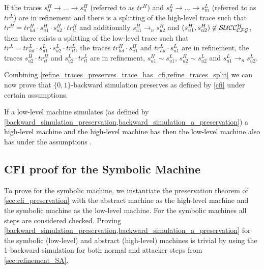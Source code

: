 \begin{lemma}
\label{refine_traces_split}
\renewcommand{\baselinestretch}{1.25}\normalsize If the traces $s^H_0
\to \ldots \to s^H_n$ (referred to as $tr^H$) and $s^L_0 \to \ldots
\to s^L_m$ (referred to as $tr^L$) are in refinement and there is a
splitting of the high-level trace such that $tr^H = tr^H_{hd} \cdot
s^H_{u1} \cdot s^H_{u2} \cdot tr^H_{tl}$ and additionally $s^H_{u1}
\to_n s^H_{u2}$ and $(s^H_{u1},s^H_{u2}) \not \in \mathcal{SUCC_\mathcal{CFG}^{H}}$, then
there exists a splitting of the low-level trace such that $tr^L =
tr^L_{hd}  \cdot  s^L_{u1}  \cdot  s^L_{u2}  \cdot  tr^L_{tl}$, the
traces $tr^H_{hd}  \cdot  s^H_{u1}$ and $tr^L_{hd}  \cdot  s^L_{u1}$
are in refinement, the traces $s^H_{u2}  \cdot  tr^H_{tl}$ and
$s^L_{u2}  \cdot  tr^L_{tl}$ are in refinement, $s^H_{u1} \sim
s^L_{u1}$, $s^H_{u2} \sim s^L_{u2}$ and $s^L_{u1} \to_n s^L_{u2}$.
\end{lemma}

Combining
\cref{refine_traces_preserves_trace_has_cfi,refine_traces_split} we
can now prove that $\lbrace 0,1 \rbrace$-backward simulation preserves
\CFI as defined by \cref{cfi} under certain assumptions.

\begin{theorem}
\label{backward_refinement_preserves_cfi}
If a low-level machine simulates (as defined by
\cref{backward_simulation_preservation,backward_simulation_a_preservation})
a high-level machine and the high-level machine has \CFI then the
low-level machine also has \CFI under the assumptions
.
\end{theorem}

\subsection{CFI proof for the Symbolic Machine}
\label{sec:symbolic_proof}

To prove \CFI for the symbolic machine, we instantiate the
preservation theorem of \cref{sec:cfi_preservation} with the abstract
machine as the high-level machine and the symbolic machine as the
low-level machine. For the symbolic machines all steps are considered
checked. Proving
\cref{backward_simulation_preservation,backward_simulation_a_preservation}
for the symbolic (low-level) and abstract (high-level) machines is
trivial by using the 1-backward simulation for both normal and
attacker steps from \cref{sec:refinement_SA}.

